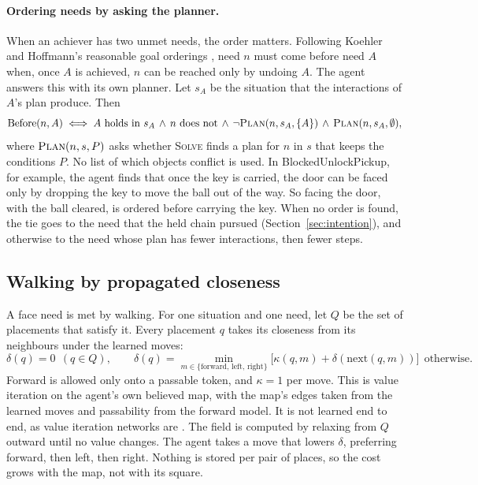 \documentclass{article}
\newcommand{\cond}[1]{\textsf{#1}}
\begin{document}
\paragraph{Ordering needs by asking the planner.} When an achiever has two unmet needs, the order matters. Following Koehler and Hoffmann's reasonable goal orderings \cite{Koehler2000}, need $n$ must come before need $A$ when, once $A$ is achieved, $n$ can be reached only by undoing $A$. The agent answers this with its own planner. Let $s_A$ be the situation that the interactions of $A$'s plan produce. Then
\begin{equation} \label{eq:order}
    \mathrm{Before}(n,A) \iff A \text{ holds in } s_A \,\wedge\, n \text{ does not} \,\wedge\, \neg\textsc{Plan}(n, s_A, \{A\}) \,\wedge\, \textsc{Plan}(n, s_A, \emptyset),
\end{equation}
where $\textsc{Plan}(n,s,P)$ asks whether \textsc{Solve} finds a plan for $n$ in $s$ that keeps the conditions $P$. No list of which objects conflict is used. In BlockedUnlockPickup, for example, the agent finds that once the key is carried, the door can be faced only by dropping the key to move the ball out of the way. So facing the door, with the ball cleared, is ordered before carrying the key. When no order is found, the tie goes to the need that the held chain pursued (Section~\ref{sec:intention}), and otherwise to the need whose plan has fewer interactions, then fewer steps.

\subsection{Walking by propagated closeness}
\label{sec:walking}

A \cond{face} need is met by walking. For one situation and one need, let $Q$ be the set of placements that satisfy it. Every placement $q$ takes its closeness from its neighbours under the learned moves:
\begin{equation} \label{eq:bellman}
    \delta(q) = 0 \ \ (q\in Q), \qquad \delta(q) = \min_{m\in\{\text{forward},\,\text{left},\,\text{right}\}}\big[\kappa(q,m) + \delta(\mathrm{next}(q,m))\big] \ \ \text{otherwise}.
\end{equation}
Forward is allowed only onto a passable token, and $\kappa=1$ per move. This is value iteration \cite{Bellman1957} on the agent's own believed map, with the map's edges taken from the learned moves and passability from the forward model. It is not learned end to end, as value iteration networks are \cite{Tamar2016}. The field is computed by relaxing from $Q$ outward until no value changes. The agent takes a move that lowers $\delta$, preferring forward, then left, then right. Nothing is stored per pair of places, so the cost grows with the map, not with its square.
\end{document}
